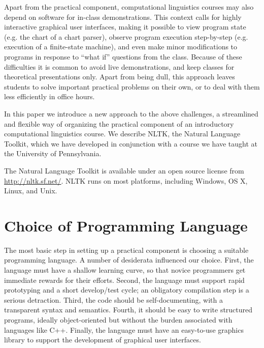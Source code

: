 \documentclass[11pt]{article}
\begin{document}
Apart from the practical component, computational linguistics courses
may also depend on software for in-class demonstrations.  This context
calls for highly interactive graphical user interfaces, making it
possible to view program state (e.g. the chart of a chart parser),
observe program execution step-by-step (e.g. execution of a
finite-state machine), and even make minor modifications to programs
in response to ``what if'' questions from the class.  Because of these
difficulties it is common to avoid live demonstrations, and keep
classes for theoretical presentations only.  Apart from being dull,
this approach leaves students to solve important practical problems on
their own, or to deal with them less efficiently in office hours.

In this paper we introduce a new approach to the above challenges, a
streamlined and flexible way of organizing the practical component of
an introductory computational linguistics course.  We describe NLTK,
the Natural Language Toolkit, which we have developed in conjunction
with a course we have taught at the University of Pennsylvania.

The Natural Language Toolkit is available under an open source license
from \mbox{\url{http://nltk.sf.net/}}.  NLTK runs on most platforms, including
Windows, OS X, Linux, and Unix.

\section{Choice of Programming Language}
\label{sec:python}

The most basic step in setting up a practical component is choosing a
suitable programming language.  A number of desiderata influenced our
choice.  First, the language must have a shallow learning curve, so
that novice programmers get immediate rewards for their efforts.
Second, the language must support rapid prototyping and a short
develop/test cycle; an obligatory compilation step is a serious
detraction.  Third, the code should be self-documenting, with a
transparent syntax and semantics.  Fourth, it should be easy to write
structured programs, ideally object-oriented but without the burden
associated with languages like C++.  Finally, the language must have
an easy-to-use graphics library to support the development of
graphical user interfaces.
\end{document}
